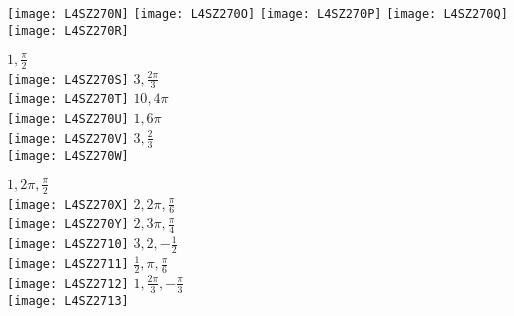 \begin{Answer}[ref={exTrigonometricFunctions}]

	\Question %
\begin{tasks}
	\task 	 \texttt{[image: L4SZ270N]}
	\task 	 \texttt{[image: L4SZ270O]}
	\task 	 \texttt{[image: L4SZ270P]}
	\task 	 \texttt{[image: L4SZ270Q]}
	\task 	 \texttt{[image: L4SZ270R]}
\end{tasks}
\Question %
\begin{tasks}
	\task 	$1 ,\frac{\pi }{2}$\\	\texttt{[image: L4SZ270S]}
	\task 	$3 ,\frac{2 \pi }{3}$\\	\texttt{[image: L4SZ270T]}
	\task 	$10 ,4 \pi $\\			\texttt{[image: L4SZ270U]} 
	\task 	$1 ,6 \pi $\\			\texttt{[image: L4SZ270V]} 
	\task   $3 ,\frac{2}{3}$\\		\texttt{[image: L4SZ270W]} 
\end{tasks}
\Question %
\begin{tasks}
	\task 	$1 ,2 \pi  ,\frac{\pi }{2}$\\ 	\texttt{[image: L4SZ270X]} 
	\task 	$2 ,2 \pi  ,\frac{\pi }{6}$\\	\texttt{[image: L4SZ270Y]} 
	\task 	$2 ,3 \pi  ,\frac{\pi }{4}$\\	\texttt{[image: L4SZ2710]} 
	\task 	$3 ,2 , -\frac{1}{2}$\\			\texttt{[image: L4SZ2711]} 
	\task   $\frac{1}{2} ,\pi  ,\frac{\pi }{6}$\\		\texttt{[image: L4SZ2712]}  
	\task	$1 ,\frac{2 \pi }{3} , -\frac{\pi }{3}$\\	\texttt{[image: L4SZ2713]} 
\end{tasks}

\end{Answer}%

